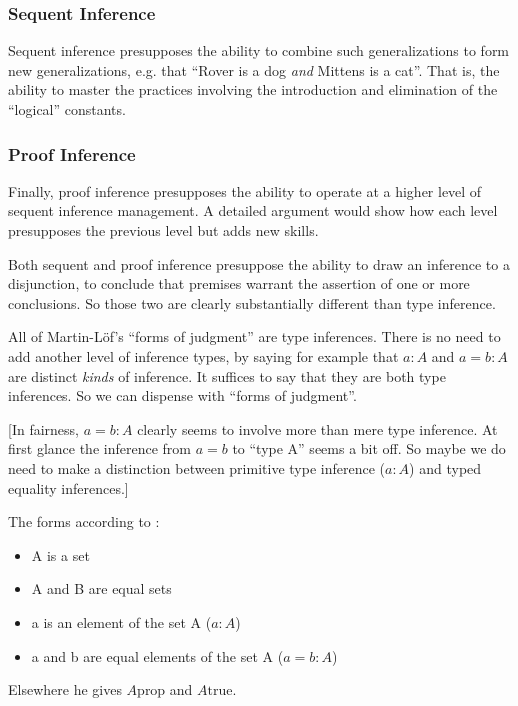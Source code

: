 \documentclass{article}
\begin{document}
\subsubsection{Sequent Inference}
Sequent inference presupposes the ability to combine such
generalizations to form new generalizations, e.g. that ``Rover is a
dog \textit{and} Mittens is a cat''. That is, the ability to master
the practices involving the introduction and elimination of the
``logical'' constants.

\subsubsection{Proof Inference}
Finally, proof inference presupposes the ability to operate at a higher
level of sequent inference management. A detailed argument would show
how each level presupposes the previous level but adds new skills.

Both sequent and proof inference presuppose the ability to draw an
inference to a disjunction, to conclude that premises warrant the
assertion of one or more conclusions. So those two are clearly
substantially different than type inference.


All of Martin-Löf's ``forms of judgment'' are type inferences. There
is no need to add another level of inference types, by saying for
example that \mbox{\(a:A\)} and \mbox{\(a=b:A\)} are distinct
\textit{kinds} of inference. It suffices to say that they are both
type inferences. So we can dispense with ``forms of judgment''.

[In fairness, \(a=b:A\) clearly seems to involve more than mere type
  inference. At first glance the inference from \(a=b\) to ``type A''
  seems a bit off. So maybe we do need to make a distinction between
  primitive type inference (\(a:A\)) and typed equality inferences.]


The forms according to  \parencite{martin1984intuitionistic}:

\begin{itemize}
\item A is a set
\item A and B are equal sets
\item a is an element of the set A  (\(a:A\))
\item a and b are equal elements of the set A (\(a=b:A\))
\end{itemize}

Elsewhere he gives \(A \text{prop}\) and \(A \text{true}\).
\end{document}
